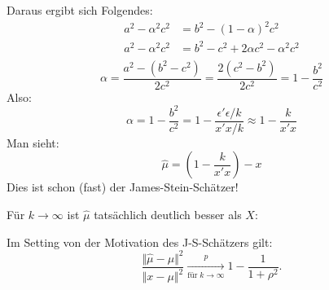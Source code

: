 \documentclass[10pt]{article}
\newcommand{\KW}{\overset{p} \longrightarrow} %
\begin{document}
	Daraus ergibt sich Folgendes: 
	\begin{equation*}
		\begin{split}
			a^2 - \alpha^2 c^2 &= b^2 - (1-\alpha)^2 c^2\\
			a^2 -\alpha^2 c^2 &= b^2 - c^2 + 2 \alpha c^2 - \alpha^2 c^2 \\
		\end{split}
	\end{equation*}
	\begin{equation*}
		\alpha = \frac{a^2-(b^2-c^2)}{2c^2} = \frac{2(c^2-b^2)}{2c^2} = 1-\frac{b^2}{c^2}
	\end{equation*}
	Also:
	\begin{equation*}
		\alpha = 1-\frac{b^2}{c^2} = 1-\frac{\epsilon' \epsilon / k}{x'x/k} \approx 1-\frac{k}{x'x}
	\end{equation*}
	Man sieht:
	\begin{equation*}
		\hat{\mu}= \left(1- \frac{k}{x'x}\right)-x
	\end{equation*}
	Dies ist schon (fast) der James-Stein-Schätzer!
	
	Für $k \rightarrow \infty$ ist $\hat{\mu}$ tatsächlich deutlich besser als $X$:
	
	\begin{Proposition}[Proposition 1.5.2]
		Im Setting von der Motivation des J-S-Schätzers gilt:
		\begin{equation*}
			\frac{\Vert \hat{\mu} - \mu \Vert^2}{\Vert x - \mu \Vert^2} \underset{\text{für} \; k \rightarrow \infty} {\KW} 1 - \frac{1}{1+ \rho^2}.
		\end{equation*}
	\end{Proposition}
	
\end{document}
